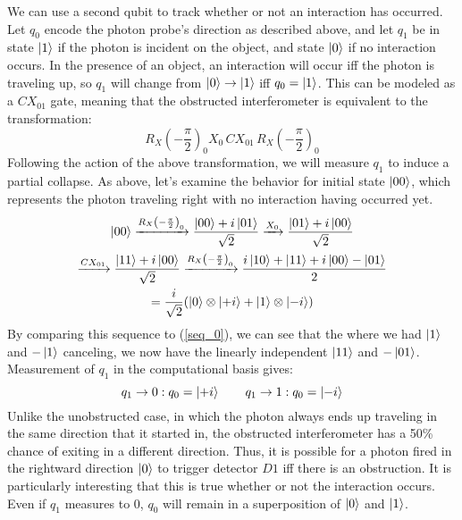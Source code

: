 \documentclass{article}
\begin{document}
We can use a second qubit to track whether or not an interaction has occurred. Let $q_0$ encode the photon probe's direction as described above, and let $q_1$ be in state $\ket 1$ if the photon is incident on the object, and state $\ket 0$ if no interaction occurs. In the presence of an object, an interaction will occur iff the photon is traveling up, so $q_1$ will change from $\ket 0 \to \ket 1$ iff $q_0 = \ket 1$. This can be modeled as a $CX_{01}$ gate, meaning that the obstructed interferometer is equivalent to the transformation:
$$R_X\left(-\frac{\pi}{2}\right)_0 X_0 \, CX_{01} \, R_X\left(-\frac{\pi}{2}\right)_0$$
Following the action of the above transformation, we will measure $q_1$ to induce a partial collapse. As above, let's examine the behavior for initial state $\ket{00}$, which represents the photon traveling right with no interaction having occurred yet.
\begin{multline*}
\ket{00} \xrightarrow{R_X\left(-\frac{\pi}{2}\right)_0} \frac{\ket{00} + i\ket{01}}{\sqrt{2}} \xrightarrow{X_0} \frac{\ket{01} + i\ket{00}}{\sqrt{2}}\\
\xrightarrow{CX_{01}} \frac{\ket{11} + i\ket{00}}{\sqrt{2}} \xrightarrow{R_X\left(-\frac{\pi}{2}\right)_0} \frac{i\ket{10} + \ket{11} + i\ket{00} - \ket{01}}{2}\\
= \frac{i}{\sqrt{2}}(\ket0 \otimes \ket{+i} + \ket1 \otimes \ket{-i})
\end{multline*}
By comparing this sequence to (\ref{seq_0}), we can see that the where we had $\ket 1$ and $-\ket 1$ canceling, we now have the linearly independent $\ket{11}$ and $-\ket{01}$. Measurement of $q_1$ in the computational basis gives:
$$q_1 \to 0: q_0 = \ket{+i} \qquad q_1 \to 1: q_0 = \ket{-i}$$
Unlike the unobstructed case, in which the photon always ends up traveling in the same direction that it started in, the obstructed interferometer has a 50\% chance of exiting in a different direction. Thus, it is possible for a photon fired in the rightward direction $\ket 0$ to trigger detector $D1$ iff there is an obstruction. It is particularly interesting that this is true whether or not the interaction occurs. Even if $q_1$ measures to 0, $q_0$ will remain in a superposition of $\ket 0$ and $\ket 1$.
\end{document}
